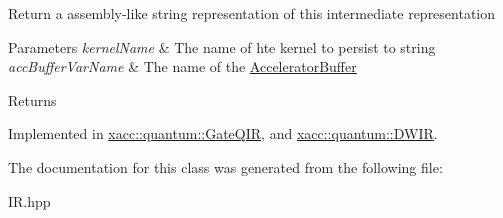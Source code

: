 Return a assembly-\/like string representation of this intermediate representation


\begin{DoxyParams}{Parameters}
{\em kernel\+Name} & The name of hte kernel to persist to string \\
\hline
{\em acc\+Buffer\+Var\+Name} & The name of the \hyperlink{a01123}{Accelerator\+Buffer} \\
\hline
\end{DoxyParams}
\begin{DoxyReturn}{Returns}

\end{DoxyReturn}


Implemented in \hyperlink{a01027_a7153f7e9f516d43af3d5d4f95d60bd86}{xacc\+::quantum\+::\+Gate\+Q\+IR}, and \hyperlink{a00979_a880cb60197577ea31115331e3a030e3e}{xacc\+::quantum\+::\+D\+W\+IR}.



The documentation for this class was generated from the following file\+:\begin{DoxyCompactItemize}
\item 
I\+R.\+hpp\end{DoxyCompactItemize}
